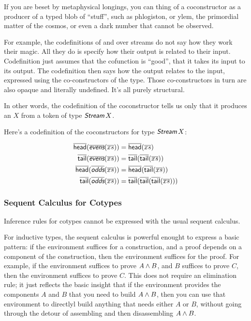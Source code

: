 \documentclass{article}
\begin{document}
If you are beset by metaphysical longings, you can thing of a
coconstructor as a producer of a typed blob of ``stuff'', such as
phlogiston, or ylem, the primordial matter of the cosmos, or even a
dark number that cannot be observed.

For example, the codefinitions of  and  over
streams do not say how they work their magic. All they do is specify
how their output is related to their input. Codefinition just assumes
that the cofunction is ``good'', that it takes its input to its
output. The codefinition then says how the output relates to the
input, expressed using the co-constructors of the type. Those
co-constructors in turn are also opaque and literally undefined. It's
all purely structural.

In other words, the codefinition of the coconstructor \cohead tells us
only that it produces an \(X\) from a token of type \(\Stream\, X\).

Here's a codefinition of the coconstructors for type \(\Stream\, X\):

\begin{align}
  \cohead(\codefn{evens}(\coseq{x})) & = \cohead(\coseq{x}) \\
  \cotail(\codefn{evens}(\coseq{x})) & = \cotail(\cotail(\coseq{x})) \\
  \cohead(\codefn{odds}(\coseq{x})) & = \cohead(\cotail(\coseq{x})) \\
  \cotail(\codefn{odds}(\coseq{x})) & = \cotail(\cotail(\cotail(\coseq{x})))
\end{align}

\subsubsection{Sequent Calculus for Cotypes}

Inference rules for cotypes cannot be expressed with the usual sequent
calculus.

For inductive types, the sequent calculus is powerful enought to
express a basic pattern: if the environment suffices for a
construction, and a proof depends on a component of the construction,
then the environment suffices for the proof. For example, if the
environment suffices to prove \(A\land B\), and \(B\) suffices to
prove \(C\), then the environment suffices to prove \(C\). This does
not require an elimination rule; it just reflects the basic insight
that if the environment provides the components \(A\) and \(B\) that
you need to build \(A\land B\), then you can use that environment to
directlyl build anything that needs either \(A\) or \(B\), without
going through the detour of assembling and then disassembling
\(A\land B\).
\end{document}
